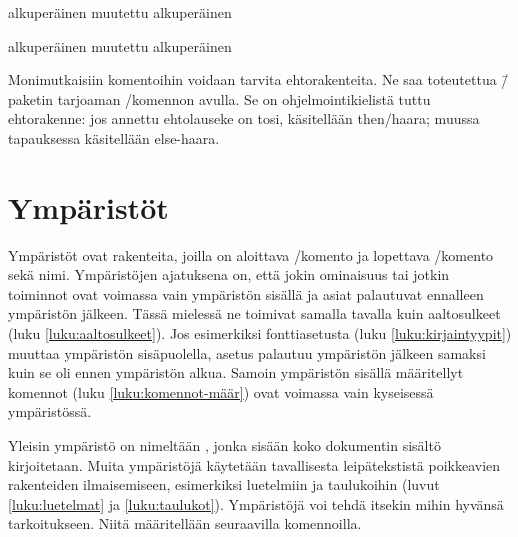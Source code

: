 \pagebreak[3]

\begin{koodilohkosis}
  \newcommand{\komento}{alkuperäinen}
  \komento
  {%
    \renewcommand{\komento}{muutettu}
    \komento
  }
  \komento
\end{koodilohkosis}

\begin{tulossis}
  alkuperäinen muutettu alkuperäinen
\end{tulossis}

Monimutkaisiin komentoihin voidaan tarvita ehtorakenteita. Ne saa
toteutettua \=/paketin tarjoaman
\-/komennon avulla. Se on
ohjelmointikielistä tuttu ehtorakenne: jos annettu ehtolauseke on tosi,
käsitellään then\-/haara; muussa tapauksessa käsitellään else-haara.

\section{Ympäristöt}

Ympäristöt ovat rakenteita, joilla on aloittava \-/komento ja lopettava \-/komento sekä nimi.
Ympäristöjen ajatuksena on, että jokin ominaisuus tai jotkin toiminnot
ovat voimassa vain ympäristön sisällä ja asiat palautuvat ennalleen
ympäristön jälkeen. Tässä mielessä ne toimivat samalla tavalla kuin
aaltosulkeet (luku \ref{luku:aaltosulkeet}). Jos esimerkiksi
fonttiasetusta (luku \ref{luku:kirjaintyypit}) muuttaa ympäristön
sisäpuolella, asetus palautuu ympäristön jälkeen samaksi kuin se oli
ennen ympäristön alkua. Samoin ympäristön sisällä määritellyt komennot
(luku \ref{luku:komennot-määr}) ovat voimassa vain kyseisessä
ympäristössä.

\begin{koodilohkosis}
  \begin{nimi}
  \end{nimi}
\end{koodilohkosis}

Yleisin ympäristö on nimeltään , jonka sisään koko
dokumentin sisältö kirjoitetaan. Muita ympäristöjä käytetään
tavallisesta leipätekstistä poikkeavien rakenteiden ilmaisemiseen,
esimerkiksi luetelmiin ja taulukoihin (luvut \ref{luku:luetelmat} ja
\ref{luku:taulukot}). Ympäristöjä voi tehdä itsekin mihin hyvänsä
tarkoitukseen. Niitä määritellään seuraavilla komennoilla.

